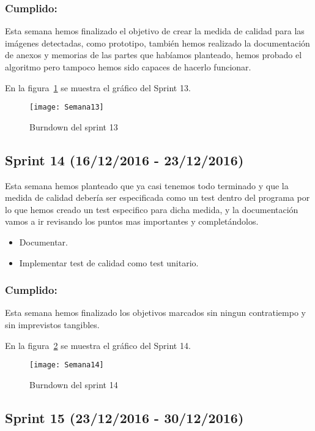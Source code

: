 \subsubsection{Cumplido:}
Esta semana hemos finalizado el objetivo de crear la medida de calidad para las imágenes detectadas, como prototipo, también hemos realizado la documentación de anexos y memorias de las partes que habíamos planteado, hemos probado el algoritmo pero tampoco hemos sido capaces de hacerlo funcionar.


En la figura~\ref{fig:A.2.13} se muestra el gráfico del Sprint 13.

\begin{figure}[h]
\centering
\texttt{[image: Semana13]}
\caption{Burndown del sprint 13}
\label{fig:A.2.13}
\end{figure}

\subsection{Sprint 14 (16/12/2016 - 23/12/2016)}
Esta semana hemos planteado que ya casi tenemos todo terminado y que la medida de calidad debería ser especificada como un test dentro del programa por lo que hemos creado un test especifico para dicha medida, y la documentación vamos a ir revisando los puntos mas importantes y completándolos.

\begin{itemize}
	\item Documentar.
	\item Implementar test de calidad como test unitario.
\end{itemize}
\subsubsection{Cumplido:}
Esta semana hemos finalizado los objetivos marcados sin ningun contratiempo y sin imprevistos tangibles.

En la figura~\ref{fig:A.2.14} se muestra el gráfico del Sprint 14.

\begin{figure}[h]
\centering
\texttt{[image: Semana14]}
\caption{Burndown del sprint 14}
\label{fig:A.2.14}
\end{figure}

\subsection{Sprint 15 (23/12/2016 - 30/12/2016)}

